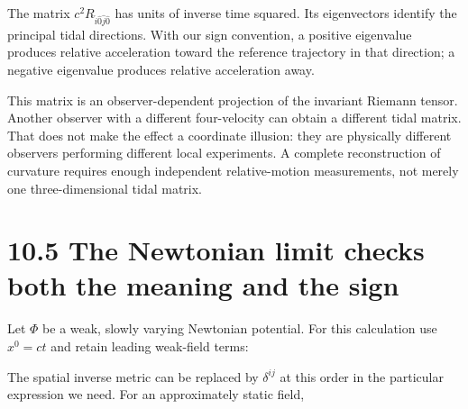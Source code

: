 \documentclass[
  11pt,
  letterpaper,
  oneside,
  openany]{scrbook}
\begin{document}
\begin{center}
\begingroup
{}
\ifdim\wd\grmathbox>\linewidth
\resizebox{\linewidth}{!}{\usebox{\grmathbox}}
\else\usebox{\grmathbox}\fi
\endgroup
\end{center}

The matrix \(c^2R_{\hat i\hat0\hat j\hat0}\) has units of inverse time
squared. Its eigenvectors identify the principal tidal directions. With
our sign convention, a positive eigenvalue produces relative
acceleration toward the reference trajectory in that direction; a
negative eigenvalue produces relative acceleration away.

This matrix is an observer-dependent projection of the invariant Riemann
tensor. Another observer with a different four-velocity can obtain a
different tidal matrix. That does not make the effect a coordinate
illusion: they are physically different observers performing different
local experiments. A complete reconstruction of curvature requires
enough independent relative-motion measurements, not merely one
three-dimensional tidal matrix.

\hypertarget{the-newtonian-limit-checks-both-the-meaning-and-the-sign}{%
\section{10.5 The Newtonian limit checks both the meaning and the
sign}\label{the-newtonian-limit-checks-both-the-meaning-and-the-sign}}

Let \(\Phi\) be a weak, slowly varying Newtonian potential. For this
calculation use \(x^0=ct\) and retain leading weak-field terms:

\begin{center}
\begingroup
{}
\ifdim\wd\grmathbox>\linewidth
\resizebox{\linewidth}{!}{\usebox{\grmathbox}}
\else\usebox{\grmathbox}\fi
\endgroup
\end{center}

The spatial inverse metric can be replaced by \(\delta^{ij}\) at this
order in the particular expression we need. For an approximately static
field,

\begin{center}
\begingroup
{}
\ifdim\wd\grmathbox>\linewidth
\resizebox{\linewidth}{!}{\usebox{\grmathbox}}
\else\usebox{\grmathbox}\fi
\endgroup
\end{center}
\end{document}
